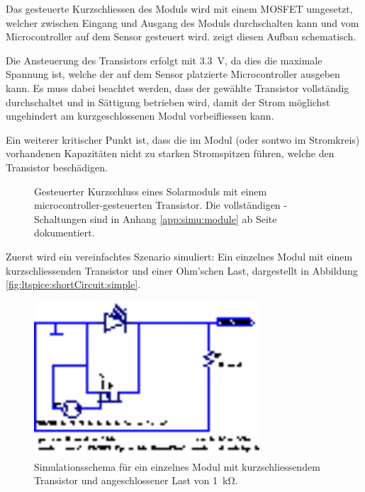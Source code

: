Das  gesteuerte Kurzschliessen  des Moduls  wird mit  einem MOSFET  umgesetzt,
welcher zwischen  Eingang und  Ausgang des Moduls  durchschalten kann  und vom
Microcontroller auf dem Sensor gesteuert wird. 
zeigt diesen Aufbau schematisch.

Die  Ansteuerung des  Transistors  erfolgt mit  \SI{3.3}{\volt},  da dies  die
maximale Spannung  ist, welche der  auf dem Sensor  platzierte Microcontroller
ausgeben kann. Es muss  dabei beachtet werden, dass  der gew\"ahlte Transistor
vollst\"andig durchschaltet und in S\"attigung betrieben wird, damit der Strom
m\"oglichst ungehindert am kurzgeschlossenen Modul vorbeifliessen kann.

Ein  weiterer  kritischer  Punkt  ist,  dass die  im  Modul  (oder  sontwo  im
Stromkreis) vorhandenen Kapazit\"aten nicht  zu starken Stromspitzen f\"uhren,
welche den Transistor besch\"adigen.

\begin{figure}[h!tb]
    \centering
    
    \caption{%
        Gesteuerter     Kurzschluss     eines    Solarmoduls     mit     einem
        microcontroller-gesteuerten       Transistor. Die      vollst\"andigen
        -Schaltungen  sind  in Anhang  \ref{app:simu:module}  ab
        Seite \pageref{app:simu:module} dokumentiert.%
    }
    \label{fig:module:mosfet:simple}
\end{figure}


Zuerst wird ein vereinfachtes Szenario simuliert: Ein einzelnes Modul mit einem
kurzschliessenden Transistor und einer Ohm'schen Last, dargestellt in Abbildung
\ref{fig:ltspice:shortCircuit:simple}.

\begin{figure}[h!tb]
    \centering
    \includegraphics[width=0.75\textwidth]{images/ltspice/jac/shortcircuit-transmitter.eps}
    \caption{
        Simulationsschema  f\"ur  ein  einzelnes Modul  mit  kurzschliessendem
        Transistor und angeschlossener Last von \SI{1}{\kilo\ohm}.%
    }
    \label{fig:ltspice:shortCircuit:transmitter}
\end{figure}

